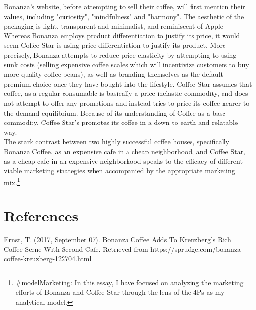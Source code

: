\documentclass{article}
\begin{document}
\newgeometry{}

Bonanza's website, before attempting to sell their coffee, will first mention their values, including "curiosity", "mindfulness" and "harmony". The aesthetic of the packaging is light, transparent and minimalist, and reminiscent of Apple.\\



Whereas Bonanza employs product differentiation to justify its price, it would seem Coffee Star is using price differentiation to justify its product. More precisely, Bonanza attempts to reduce price elasticity by attempting to using sunk costs (selling expensive coffee scales which will incentivize customers to buy more quality coffee beans), as well as branding themselves as the default premium choice once they have bought into the lifestyle. Coffee Star assumes that coffee, as a regular consumable is basically a price inelastic commodity, and does not attempt to offer any promotions and instead tries to price its coffee nearer to the demand equilibrium. Because of its understanding of Coffee as a base commodity, Coffee Star's promotes its coffee in a down to earth and relatable way.\\


The stark contrast between two highly successful coffee houses, specifically Bonanza Coffee, as an expensive cafe in a cheap neighborhood, and Coffee Star, as a cheap cafe in an expensive neighborhood speaks to the efficacy of different viable marketing strategies when accompanied by the appropriate marketing mix.\footnote{\#modelMarketing: In this essay, I have focused on analyzing the marketing efforts of Bonanza and Coffee Star through the lens of the 4Ps as my analytical model.}



\section*{References}

Ernst, T. (2017, September 07). Bonanza Coffee Adds To Kreuzberg's Rich Coffee Scene With Second Cafe. Retrieved from https://sprudge.com/bonanza-coffee-kreuzberg-122704.html
\end{document}

